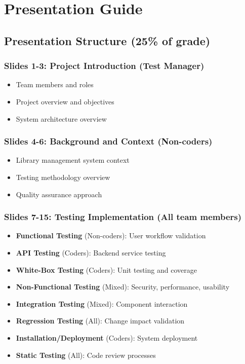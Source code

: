 \documentclass[12pt,a4paper]{article}
\begin{document}
\section{Presentation Guide}

\subsection{Presentation Structure (25\% of grade)}

\subsubsection{Slides 1-3: Project Introduction (Test Manager)}
\begin{itemize}[leftmargin=*]
    \item Team members and roles
    \item Project overview and objectives
    \item System architecture overview
\end{itemize}

\subsubsection{Slides 4-6: Background and Context (Non-coders)}
\begin{itemize}[leftmargin=*]
    \item Library management system context
    \item Testing methodology overview
    \item Quality assurance approach
\end{itemize}

\subsubsection{Slides 7-15: Testing Implementation (All team members)}
\begin{itemize}[leftmargin=*]
    \item \textbf{Functional Testing} (Non-coders): User workflow validation
    \item \textbf{API Testing} (Coders): Backend service testing
    \item \textbf{White-Box Testing} (Coders): Unit testing and coverage
    \item \textbf{Non-Functional Testing} (Mixed): Security, performance, usability
    \item \textbf{Integration Testing} (Mixed): Component interaction
    \item \textbf{Regression Testing} (All): Change impact validation
    \item \textbf{Installation/Deployment} (Coders): System deployment
    \item \textbf{Static Testing} (All): Code review processes
\end{itemize}
\end{document}
